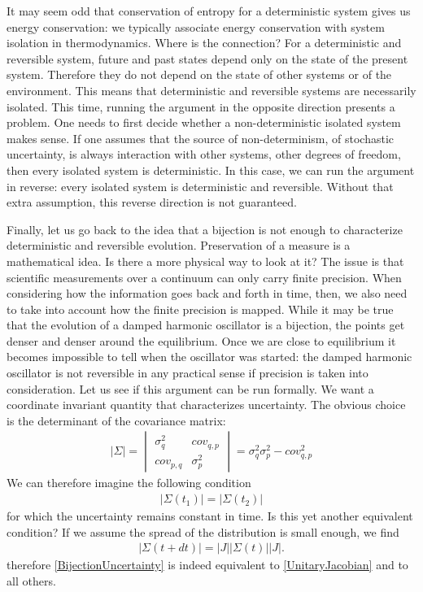 \documentclass[10pt,twocolumn, nofootinbib]{revtex4-2}
\begin{document}
It may seem odd that conservation of entropy for a deterministic system gives us energy conservation: we typically associate energy conservation with system isolation in thermodynamics. Where is the connection? For a deterministic and reversible system, future and past states depend only on the state of the present system. Therefore they do not depend on the state of other systems or of the environment. This means that deterministic and reversible systems are necessarily isolated. This time, running the argument in the opposite direction presents a problem. One needs to first decide whether a non-deterministic isolated system makes sense. If one assumes that the source of non-determinism, of stochastic uncertainty, is always interaction with other systems, other degrees of freedom, then every isolated system is deterministic. In this case, we can run the argument in reverse: every isolated system is deterministic and reversible. Without that extra assumption, this reverse direction is not guaranteed.

Finally, let us go back to the idea that a bijection is not enough to characterize deterministic and reversible evolution. Preservation of a measure is a mathematical idea. Is there a more physical way to look at it? The issue is that scientific measurements over a continuum can only carry finite precision. When considering how the information goes back and forth in time, then, we also need to take into account how the finite precision is mapped. While it may be true that the evolution of a damped harmonic oscillator is a bijection, the points get denser and denser around the equilibrium. Once we are close to equilibrium it becomes impossible to tell when the oscillator was started: the damped harmonic oscillator is not reversible in any practical sense if precision is taken into consideration. Let us see if this argument can be run formally. We want a coordinate invariant quantity that characterizes uncertainty. The obvious choice is the determinant of the covariance matrix:
\begin{align}\label{CovarianceMatrix}
	|\Sigma| = \begin{vmatrix}
		\sigma_q^2 & cov_{q,p} \\
		cov_{p,q} & \sigma_p^2
	\end{vmatrix} = \sigma_q^2 \sigma_p^2 - cov_{q,p}^2
\end{align}
We can therefore imagine the following condition
\begin{align}\label{BijectionUncertainty}
	|\Sigma(t_1)| = |\Sigma(t_2)| 
\end{align}
for which the uncertainty remains constant in time. Is this yet another equivalent condition? If we assume the spread of the distribution is small enough, we find
\begin{align}
	|\Sigma(t + dt)| = |J| |\Sigma(t)| |J|.
\end{align}
therefore \eqref{BijectionUncertainty} is indeed equivalent to \eqref{UnitaryJacobian} and to all others.
\end{document}

